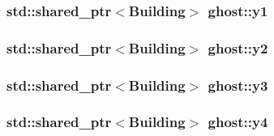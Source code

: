 \hypertarget{namespaceghost_af02ccfe4153013ca001f67b21cb8ba43}{
\subsubsection[{y1}]{\setlength{\rightskip}{0pt plus 5cm}std\-::shared\-\_\-ptr$<${\bf Building}$>$ ghost\-::y1}}\label{namespaceghost_af02ccfe4153013ca001f67b21cb8ba43}
\hypertarget{namespaceghost_ab6fc6f6a8069edbc2ae66e3f4c95e988}{
\subsubsection[{y2}]{\setlength{\rightskip}{0pt plus 5cm}std\-::shared\-\_\-ptr$<${\bf Building}$>$ ghost\-::y2}}\label{namespaceghost_ab6fc6f6a8069edbc2ae66e3f4c95e988}
\hypertarget{namespaceghost_a48fd5802a1f5deeffa729a4be630b172}{
\subsubsection[{y3}]{\setlength{\rightskip}{0pt plus 5cm}std\-::shared\-\_\-ptr$<${\bf Building}$>$ ghost\-::y3}}\label{namespaceghost_a48fd5802a1f5deeffa729a4be630b172}
\hypertarget{namespaceghost_a959bf3d4c6eabc2dda3faeed7e7ea7a9}{
\subsubsection[{y4}]{\setlength{\rightskip}{0pt plus 5cm}std\-::shared\-\_\-ptr$<${\bf Building}$>$ ghost\-::y4}}\label{namespaceghost_a959bf3d4c6eabc2dda3faeed7e7ea7a9}
